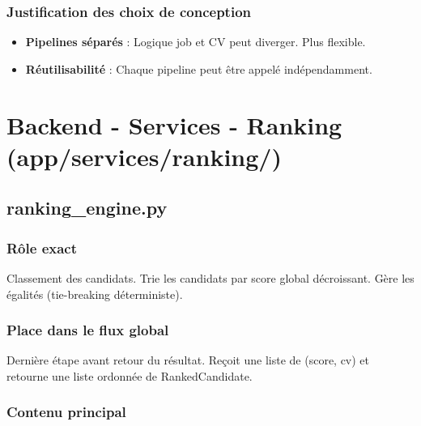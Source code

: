 \documentclass[12pt,a4paper,oneside]{book}
\begin{document}
\subsubsection{Justification des choix de conception}

\begin{itemize}
    \item \textbf{Pipelines séparés} : Logique job et CV peut diverger. Plus flexible.
    
    \item \textbf{Réutilisabilité} : Chaque pipeline peut être appelé indépendamment.
\end{itemize}

\newpage

\section{Backend - Services - Ranking (app/services/ranking/)}

\subsection{ranking\_engine.py}

\subsubsection{Rôle exact}

Classement des candidats. Trie les candidats par score global décroissant. Gère les égalités (tie-breaking déterministe).

\subsubsection{Place dans le flux global}

Dernière étape avant retour du résultat. Reçoit une liste de (score, cv) et retourne une liste ordonnée de RankedCandidate.

\subsubsection{Contenu principal}
\end{document}

